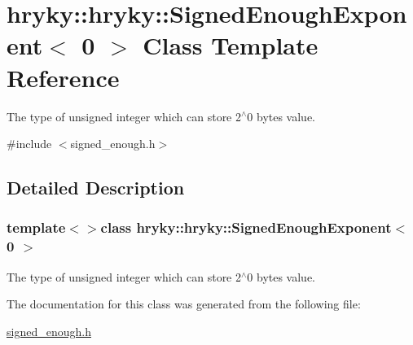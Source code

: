 \hypertarget{classhryky_1_1hryky_1_1_signed_enough_exponent_3_010_01_4}{\section{hryky\-:\-:hryky\-:\-:Signed\-Enough\-Exponent$<$ 0 $>$ Class Template Reference}
\label{classhryky_1_1hryky_1_1_signed_enough_exponent_3_010_01_4}
}


The type of unsigned integer which can store 2$^\wedge$0 bytes value.  




{\ttfamily \#include $<$signed\-\_\-enough.\-h$>$}



\subsection{Detailed Description}
\subsubsection*{template$<$$>$class hryky\-::hryky\-::\-Signed\-Enough\-Exponent$<$ 0 $>$}

The type of unsigned integer which can store 2$^\wedge$0 bytes value. 

The documentation for this class was generated from the following file\-:\begin{DoxyCompactItemize}
\item 
\hyperlink{signed__enough_8h}{signed\-\_\-enough.\-h}\end{DoxyCompactItemize}
